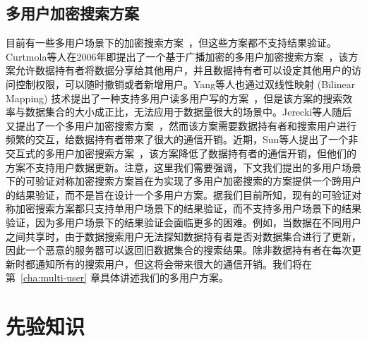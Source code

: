 \subsection{多用户加密搜索方案}
目前有一些多用户场景下的加密搜索方案~\cite{curtmola2011searchable,yang2009multiuser,jarecki2013outsourced,sun2016efficient}，但这些方案都不支持结果验证。Curtmola等人在2006年即提出了一个基于广播加密的多用户加密搜索方案~\cite{curtmola2011searchable}，该方案允许数据持有者将数据分享给其他用户，并且数据持有者可以设定其他用户的访问控制权限，可以随时撤销或者新增用户。Yang等人也通过双线性映射 (Bilinear Mapping) 技术提出了一种支持多用户读多用户写的方案~\cite{yang2009multiuser}，但是该方案的搜索效率与数据集合的大小成正比，无法应用于数据量很大的场景中。Jerecki等人随后又提出了一个多用户加密搜索方案~\cite{jarecki2013outsourced}，然而该方案需要数据持有者和搜索用户进行频繁的交互，给数据持有者带来了很大的通信开销。近期，Sun等人提出了一个非交互式的多用户加密搜索方案~\cite{sun2016efficient}，该方案降低了数据持有者的通信开销，但他们的方案不支持用户数据更新。注意，这里我们需要强调，下文我们提出的多用户场景下的可验证对称加密搜索方案旨在为实现了多用户加密搜索的方案提供一个跨用户的结果验证，而不是旨在设计一个多用户方案。据我们目前所知，现有的可验证对称加密搜索方案都只支持单用户场景下的结果验证，而不支持多用户场景下的结果验证，因为多用户场景下的结果验证会面临更多的困难。例如，当数据在不同用户之间共享时，由于数据搜索用户无法探知数据持有者是否对数据集合进行了更新，因此一个恶意的服务器可以返回旧数据集合的搜索结果。除非数据持有者在每次更新时都通知所有的搜索用户，但这将会带来很大的通信开销。我们将在第~\ref{cha:multi-user} 章具体讲述我们的多用户方案。

\section{先验知识}

